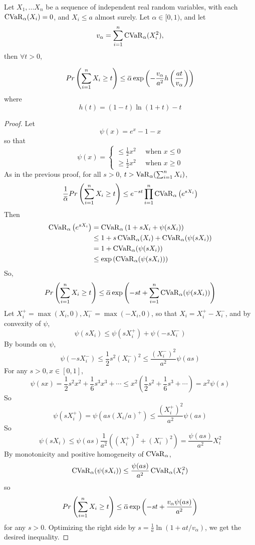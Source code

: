 \begin{prop}
	Let $X_1, ... X_n$ be a sequence of independent real random variables, with each $\operatorname{CVaR}_\alpha(X_i)  = 0$, and $X_i \le a$ almost surely. Let $\alpha \in [0, 1)$, and let 
	$$v_\alpha = \sum_{i = 1}^n\operatorname{CVaR}_\alpha(X_i^2),$$
	then $\forall t > 0$, 
	
	\begin{equation}
	\begin{aligned}
	Pr\left(\sumn X_i \ge t\right) \le {\overbar{\alpha}} \exp\left(-\frac{v_\alpha}{a^2}h\left(\frac{at}{v_\alpha}\right)\right)
	\end{aligned}
	\end{equation}
	where 
	\begin{equation}
	h(t) = (1 - t)\ln(1+t) - t
	\end{equation}
\end{prop}
\begin{proof}
	Let 
	$$\psi(x) = e^x - 1 - x$$
	so that 
	$$
	\psi(x) = 
	\begin{cases}
		\le \frac 1 2 x^2\quad \text{ when } x\le 0 \\
		\ge \frac 1 2 x^2\quad \text{ when } x\ge 0
	\end{cases}
	$$
	As in the previous proof, for all $ s > 0$, $t > \operatorname{VaR}_\alpha(\sum_{i = 1}^n X_i)$, 
	$$
	\frac 1{\overbar{\alpha}} Pr\left(\sumn X_i \ge t\right) \le e^{-st}\prod_{i=1}^n \Ca\left(e^{sX_i}\right)
	$$
	Then 
	$$ 
	\begin{aligned}
		\operatorname{CVaR}_\alpha\left(e^{sX_i}\right) &= 
			\operatorname{CVaR}_\alpha\left(1 + sX_i + \psi(sX_i)\right) \\
		&\le 1 + s\operatorname{CVaR}_\alpha(X_i) + \operatorname{CVaR}_\alpha(\psi(sX_i)) \\
		&= 1 + \operatorname{CVaR}_\alpha(\psi(sX_i))\\
		&\le \exp\left( \operatorname{CVaR}_\alpha(\psi(sX_i)) \right)
	\end{aligned}
	$$
	So, 
	$$
	 Pr\left(\sumn X_i \ge t\right) \le {\overbar{\alpha}} \exp\left(-st + \sumn \Ca(\psi(sX_i)) \right)
	$$
	Let $X_i^+ = \max(X_i, 0), X_i^- = \max(-X_i, 0)$, so that $X_i = X_i^+ - X_i^-$, and by convexity of $\psi$, 
	$$
	\psi(sX_i) \le \psi(sX_i^+) + \psi(-sX_i^-)
	$$
	By bounds on $\psi$, 
	$$\psi(-sX_i^-) \le \frac 12 s^2 (X_i^-)^2 \le  \frac{(X_i^-)^2}{a^2}\psi(as) $$
	For any $s > 0, x\in[0, 1]$, 
	$$\psi(sx) = \frac 12 s^2x^2 + \frac 16 s^3 x^3 + \cdots \le x^2 (\frac 12 s^2 + \frac 16 s^3 + \cdots) = x^2 \psi(s) $$
	So 
	$$\psi(sX_i^+) = \psi(as(X_i/a)^+) \le \frac{(X_i^+)^2}{a^2}\psi(as) 
	$$
	So 
	$$\psi(sX_i) \le \psi(as) \frac{1}{a^2} \left((X_i^+)^2 + (X_i^-)^2\right) = \frac{\psi(as)}{a^2}X_i^2$$
	By monotonicity and positive homogeneity of $\operatorname{CVaR}_\alpha$,
	$$\operatorname{CVaR}_\alpha(\psi(sX_i)) \le \frac{\psi(as)}{a^2}\operatorname{CVaR}_\alpha(X_i^2)$$
	so
	$$
	Pr\left(\sumn X_i \ge t\right) \le {\overbar{\alpha}} \exp\left(-st + \frac{v_\alpha \psi(as)}{a^2}\right)
	$$
	for any $s > 0$. Optimizing the right side by $s = \frac 1a \ln(1 + at/v_\alpha)$, we get the desired inequality.
\end{proof}

